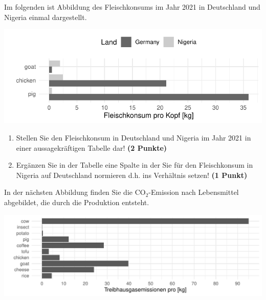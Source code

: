 \documentclass[a4paper, 10pt]{scrartcl}\usepackage[]{graphicx}\usepackage[]{xcolor}
\makeatletter
\def\maxwidth{ %
  \ifdim\Gin@nat@width>\linewidth
    \linewidth
  \else
    \Gin@nat@width
  \fi
}
\newenvironment{knitrout}{}{} %
\makeatother
\begin{document}
Im folgenden ist Abbildung des Fleischkonsums im Jahr 2021 in
Deutschland und Nigeria einmal dargestellt. 

\begin{knitrout}
\color{fgcolor}

{\centering \includegraphics[width=\maxwidth]{img/math-14-a-1} 

}


\end{knitrout}
  
\begin{enumerate}
\item Stellen Sie den Fleischkonsum in Deutschland und Nigeria im Jahr
  2021 in einer aussagekr{\"a}ftigen Tabelle dar! 
  \textbf{(2 Punkte)}
\item Erg{\"a}nzen Sie in der Tabelle eine Spalte in der Sie f{\"u}r den
  Fleischkonsum in Nigeria auf Deutschland normieren d.h. ins Verh{\"a}ltnis
  setzen! \textbf{(1 Punkt)}
\end{enumerate}

In der n{\"a}chsten Abbildung finden Sie die CO$_2$-Emission nach Lebensmittel
abgebildet, die durch die Produktion entsteht.

\begin{knitrout}
\color{fgcolor}

{\centering \includegraphics[width=\maxwidth]{img/math-14-b-1} 

}


\end{knitrout}
\end{document}
